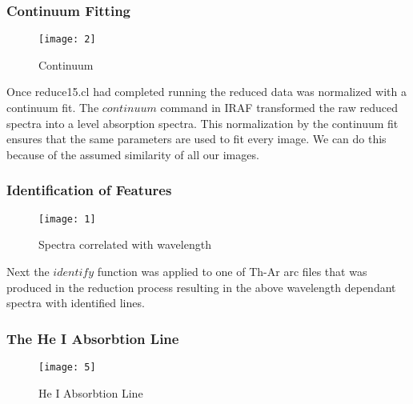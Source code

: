 \documentclass{article}
\begin{document}
\subsubsection{Continuum Fitting}
\begin{figure}
\texttt{[image: 2]} %
\caption{Continuum}
\end{figure}
Once reduce15.cl had completed running the reduced data was normalized with a continuum fit. The $continuum$ command in IRAF transformed the raw reduced spectra into a level absorption spectra. This normalization by the continuum fit ensures that the same parameters are used to fit every image. We can do this because of the assumed similarity of all our images. 
\subsubsection{Identification of Features}
\begin{figure}
\texttt{[image: 1]} %
\caption{Spectra correlated with wavelength}
\end{figure}
Next the $identify$ function was applied to one of Th-Ar arc files that was produced in the reduction process resulting in the above wavelength dependant spectra with identified lines.

\subsubsection{The He I Absorbtion Line}
\begin{figure}
\texttt{[image: 5]} %
\caption{He I Absorbtion Line}
\end{figure}
\end{document}
